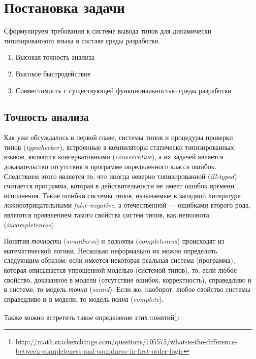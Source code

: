 \chapter{Постановка задачи}

Сформулируем требования к системе вывода типов для динамически
типизированного языка в составе среды разработки.

\begin{enumerate}
    \item{Высокая точность анализа}
    \item{Высокое быстродействие}
    \item{Совместимость с существующей функциональностью среды разработки}
\end{enumerate}

\section{Точность анализа}
\label{sec:precision-requirement}

Как уже обсуждалось в первой главе, системы типов и процедуры проверки типов
(\emph{typechecker}), встроенные в компиляторы статически типизированных
языков, являются консервативными (\emph{conservative}), а их задачей является
доказательство отсутствия в программе определенного класса ошибок. Следствием
этого является то, что иногда неверно типизированной (\emph{ill-typed})
считается программа, которая в действительности не имеет ошибок времени
исполнения. Такие ошибки системы типов, называемые в западной литературе
ложноотрицательными \emph{false-negative}, а отечественной --- ошибками второго
рода, являются проявлением такого свойства систем типов, как неполнота
(\emph{incompleteness}). 

Понятия \emph{точности} (\emph{soundness}) и \emph{полноты}
(\emph{completeness}) происходят из математической логики. Несколько неформально
их можно определить следующим образом: если имеется некоторая реальная система
(программа), которая описывается упрощенной моделью (системой типов), то, если
любое свойство, доказанное в модели (отсутствие ошибок, корректность),
справедливо и в системе, то модель \emph{точна} (\emph{sound}).  Если же,
наоборот, любое свойство системы справедливо и в модели, то модель \emph{полна}
(\emph{complete}).

Также можно встретить такое определение этих
понятий\footnote{\url{http://math.stackexchange.com/questions/105575/what-is-the-difference-between-completeness-and-soundness-in-first-order-logic}}:

